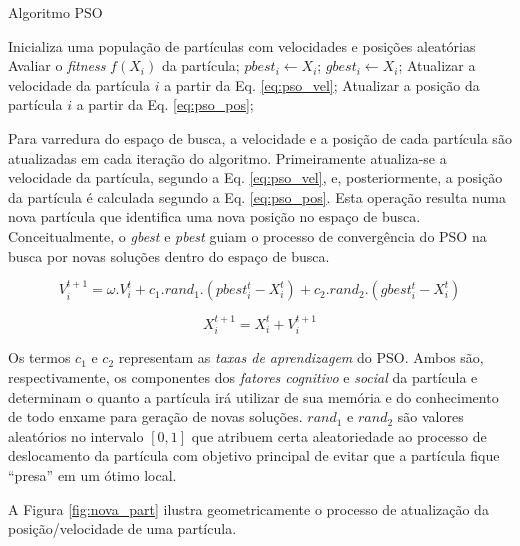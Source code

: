 \documentclass[
	12pt,				%
	openany,			%
	oneside,	
	a4paper,			%
	brazil,				%
	]{unimontes-ppgmsc-abntex2}
\begin{document}
\begin{algorithm}[ht]
\caption{Algoritmo PSO}
\label{alg:pseudo_pso}
\begin{algorithmic}[1]
\State Inicializa uma população de partículas com velocidades e posições aleatórias
		\State Avaliar o \textit{fitness} $f(X_i)$ da partícula;
		   \State $pbest_i \gets X_i$;
		\EndIf
		   \State $gbest_i \gets X_i$;
		\EndIf
		\State Atualizar a velocidade da partícula $i$ a partir da Eq. \ref{eq:pso_vel};
		\State Atualizar a posição da partícula $i$ a partir da Eq. \ref{eq:pso_pos};
	\EndFor
\EndWhile
\end{algorithmic}
\end{algorithm}

Para varredura do espaço de busca, a velocidade e a posição de cada partícula são atualizadas em cada iteração do algoritmo. Primeiramente atualiza-se a velocidade da partícula, segundo a Eq. \ref{eq:pso_vel}, e, posteriormente, a posição da partícula é calculada segundo a Eq. \ref{eq:pso_pos}. Esta operação resulta numa nova partícula que identifica uma nova posição no espaço de busca. Conceitualmente, o {\em gbest} e {\em pbest} guiam o processo de convergência do PSO na busca por novas soluções dentro do espaço de busca. 

\begin{equation}
\label{eq:pso_vel}
V^{t+1}_{i} = \omega . V^{t}_{i} + c_1 . rand_1 . (pbest^{t}_{i} - X^{t}_{i}) + c_2 . rand_2 . (gbest^{t}_{i} - X^{t}_{i})
\end{equation}

\begin{equation}
\label{eq:pso_pos}
X^{t+1}_{i} = X^{t}_{i} + V^{t+1}_{i}
\end{equation}

Os termos $c_1$ e $c_2$ representam as {\em taxas de aprendizagem} do PSO. Ambos são, respectivamente, os componentes dos {\em fatores cognitivo} e {\em social} da partícula e determinam o quanto a partícula irá utilizar de sua memória e do conhecimento de todo enxame para geração de novas soluções. $rand_1$ e $rand_2$ são valores aleatórios no intervalo $[0,1]$ que atribuem certa aleatoriedade ao processo de deslocamento da partícula com objetivo principal de evitar que a partícula fique ``presa'' em um ótimo local.

A Figura \ref{fig:nova_part} ilustra geometricamente o processo de atualização da posição/velocidade de uma partícula.
\end{document}
